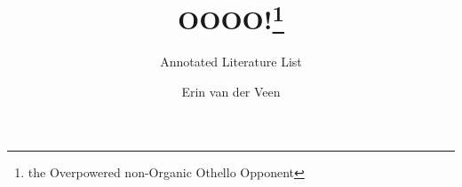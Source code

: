 \documentclass{scrartcl}
\title{OOOO!\footnote{the Overpowered non-Organic Othello Opponent}}
\subtitle{Annotated Literature List}
\author{Erin van der Veen}
\begin{document}
\maketitle

\nocite{*}



\end{document}
